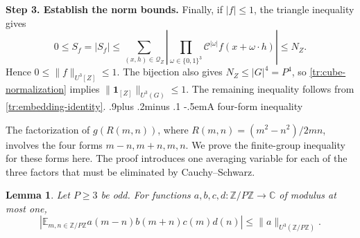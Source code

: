 \documentclass[twoside]{aomart}
\makeatletter
\theoremstyle{paperplain}
\newtheorem{lemma}[theorem]{Lemma}
\theoremstyle{paperdefinition}
\renewcommand\subsection{\@startsection{subsection}{2}{\z@}
  {.9\baselineskip plus .2\baselineskip minus .1\baselineskip}
  {-.5em}{\normalfont\bfseries}}
\renewenvironment{proof}[1][\proofname]{\par\pushQED{\qed}%
  \normalfont\topsep6\p@\@plus3\p@\relax\trivlist
  \item[\hskip\labelsep\itshape #1\@addpunct{.}]\ignorespaces
}{\popQED\endtrivlist\@endpefalse}
\newcommand{\E}{\mathbb E}
\newcommand{\Z}{\mathbb Z}
\newcommand{\C}{\mathbb C}
\numberwithin{equation}{section}
\makeatother
\begin{document}
\begin{proof}
\medskip
\noindent\textbf{Step 3. Establish the norm bounds.}
Finally, if $|f|\le1$, the triangle inequality gives
\begin{equation*}
 0\le S_f=|S_f|
 \le\sum_{(x,h)\in\mathcal Q_Z}
    \left|\prod_{\omega\in\{0,1\}^3}
        \mathcal C^{|\omega|}f(x+\omega\cdot h)\right|
 \le N_Z.
\end{equation*}
Hence $0\le\|f\|_{U^3[Z]}\le1$. The bijection also gives
$N_Z\le|G|^4=P^4$, so \eqref{tr:cube-normalization} implies
$\|\mathbf1_{[Z]}\|_{U^3(G)}\le1$. The remaining inequality
follows from \eqref{tr:embedding-identity}.
\end{proof}
\subsection{A four-form inequality}

The factorization of $g(R(m,n))$, where $R(m,n)=(m^2-n^2)/2mn$,
involves the four forms
$m-n,m+n,m,n$. We prove the finite-group inequality for these
forms here. The proof introduces one averaging variable for each
of the three factors that must be eliminated by Cauchy--Schwarz.

\begin{lemma}\label{tr:four-forms}
Let $P\ge3$ be odd. For functions
$a,b,c,d:\Z/P\Z\to\C$ of modulus at most one,
\begin{equation}
 \left|\E_{m,n\in\Z/P\Z}
       a(m-n)b(m+n)c(m)d(n)\right|
 \le\|a\|_{U^3(\Z/P\Z)}.
 \label{tr:von-neumann}
\end{equation}
\end{lemma}
\end{document}
